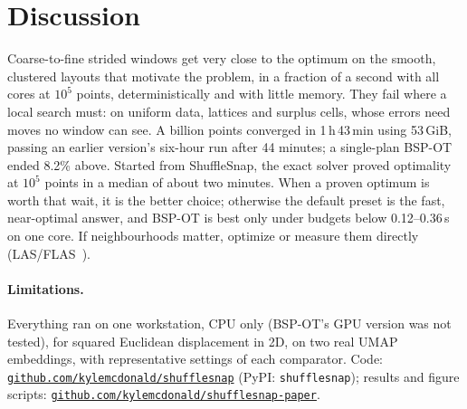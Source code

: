 \documentclass[11pt]{article}
\newcommand{\ShuffleSnap}{ShuffleSnap}
\begin{document}
\section{Discussion}

Coarse-to-fine strided windows get very close to the optimum on the smooth, clustered
layouts that motivate the problem, in a fraction of a second with all cores at $10^5$ points,
deterministically and with little memory. They fail where a local search must: on uniform
data, lattices and surplus cells, whose errors need moves no window can see.
A billion points converged in 1\,h\,43\,min using 53\,GiB, passing an earlier version's six-hour run
after 44 minutes; a single-plan BSP-OT ended 8.2\% above.
Started from \ShuffleSnap, the exact solver proved optimality at $10^5$
points in a median of about two minutes. When a proven optimum is worth that wait, it is
the better choice; otherwise the default preset is the
fast, near-optimal answer, and BSP-OT is best only under budgets below 0.12--0.36\,s on one
core.
If neighbourhoods matter, optimize or measure them directly
(LAS/FLAS~\citep{barthel2023improved}).

\paragraph{Limitations.} Everything ran on one workstation, CPU only (BSP-OT's GPU version
was not tested), for squared Euclidean displacement in 2D, on two real UMAP embeddings, with
representative settings of each comparator. Code: \href{https://github.com/kylemcdonald/shufflesnap}{\nolinkurl{github.com/kylemcdonald/shufflesnap}} (PyPI: \texttt{shufflesnap}); results and figure scripts:
\href{https://github.com/kylemcdonald/shufflesnap-paper}{\nolinkurl{github.com/kylemcdonald/shufflesnap-paper}}.
\label{page:body-end}

\clearpage


\end{document}
